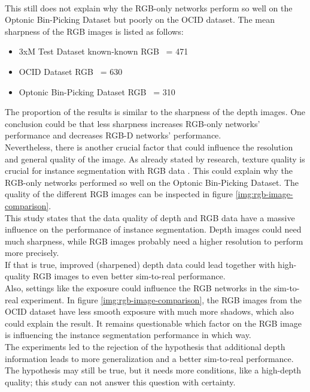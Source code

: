 		\\
		This still does not explain why the RGB-only networks perform so well on the Optonic Bin-Picking Dataset but poorly on the OCID dataset.
		The mean sharpness of the RGB images is listed as follows:
		\begin{itemize}
			\item 3xM Test Dataset known-known RGB ~= 471
			\item OCID Dataset RGB ~= 630
			\item Optonic Bin-Picking Dataset RGB ~= 310
		\end{itemize}
		The proportion of the results is similar to the sharpness of the depth images. One conclusion could be that less sharpness increases RGB-only networks' performance and decreases RGB-D networks' performance.\\
		Nevertheless, there is another crucial factor that could influence the resolution and general quality of the image. As already stated by research, texture quality is crucial for instance segmentation with RGB data \cite{Tabak2023}\cite{Martinez2019}. This could explain why the RGB-only networks performed so well on the Optonic Bin-Picking Dataset. The quality of the different RGB images can be inspected in figure \ref{img:rgb-image-comparison}.\\
		This study states that the data quality of depth and RGB data have a massive influence on the performance of instance segmentation. Depth images could need much sharpness, while RGB images probably need a higher resolution to perform more precisely.\\
		If that is true, improved (sharpened) depth data could lead together with high-quality RGB images to even better sim-to-real performance.\\
		Also, settings like the exposure could influence the RGB networks in the sim-to-real experiment. In figure \ref{img:rgb-image-comparison}, the RGB images from the OCID dataset have less smooth exposure with much more shadows, which also could explain the result. It remains questionable which factor on the RGB image is influencing the instance segmentation performance in which way.\\
		The experiments led to the rejection of the hypothesis that additional depth information leads to more generalization and a better sim-to-real performance. The hypothesis may still be true, but it needs more conditions, like a high-depth quality; this study can not answer this question with certainty. 
	
